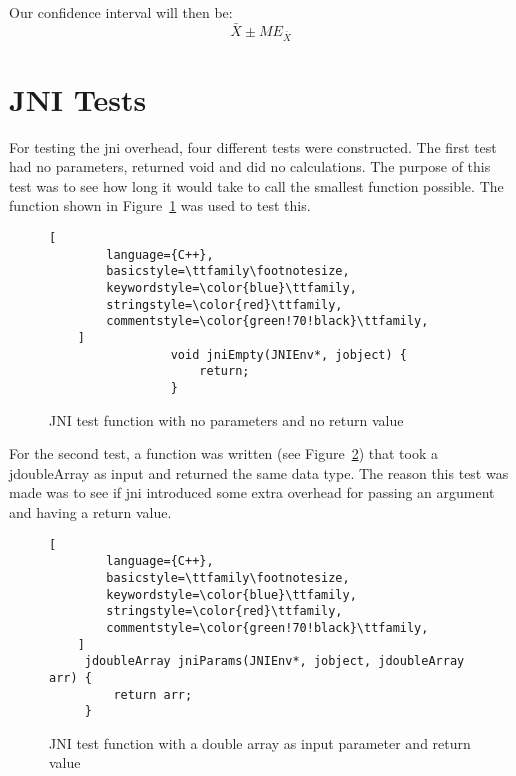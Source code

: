 Our confidence interval will then be:
\begin{equation*}
    \bar{X} \pm ME_{\bar{X}}
\end{equation*}


\section{JNI Tests}
For testing the \gls{jni} overhead, four different tests were constructed. The first test had no parameters, returned void and did no calculations. The purpose of this test was to see how long it would take to call the smallest function possible. The function shown in Figure~\ref{fig:jni:empty} was used to test this.

\begin{figure}[H]
\begin{lstlisting}[
        language={C++},
        basicstyle=\ttfamily\footnotesize,
        keywordstyle=\color{blue}\ttfamily,
        stringstyle=\color{red}\ttfamily,
        commentstyle=\color{green!70!black}\ttfamily,
    ]
                 void jniEmpty(JNIEnv*, jobject) {
                     return;
                 }
\end{lstlisting}
\caption{JNI test function with no parameters and no return value}
\label{fig:jni:empty}
\end{figure}

For the second test, a function was written (see Figure~\ref{fig:jni:params}) that took a jdoubleArray as input and returned the same data type. The reason this test was made was to see if \gls{jni} introduced some extra overhead for passing an argument and having a return value.

\begin{figure}[H]
\begin{lstlisting}[
        language={C++},
        basicstyle=\ttfamily\footnotesize,
        keywordstyle=\color{blue}\ttfamily,
        stringstyle=\color{red}\ttfamily,
        commentstyle=\color{green!70!black}\ttfamily,
    ]
     jdoubleArray jniParams(JNIEnv*, jobject, jdoubleArray arr) {
         return arr;
     }
\end{lstlisting}
\caption{JNI test function with a double array as input parameter and return value}
\label{fig:jni:params}
\end{figure}

